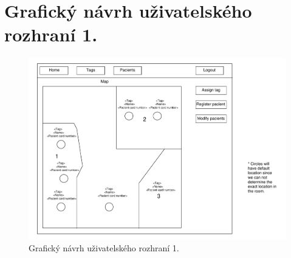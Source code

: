 \documentclass[czech,master,public,dept450,male,oneside, hidelinks]{diploma}
\begin{document}
	
	\MakeTitlePages
	
	\lstlistoflistings
	\cleardoublepage
	
	
	\setcounter{page}{14}	%
	\pagestyle{fancy}	
	
	
	
	\renewcommand{\refname}{Použitá literatura}
	\renewcommand{\bibname}{Použitá literatura}
		
	
	\appendix
	\label{appendix}
	\section{Grafický návrh uživatelského rozhraní 1.}
	\begin{figure}[H]
		\centering
		\includegraphics[width=16cm]{Appendix/src/Home.pdf}
		\caption{Grafický návrh uživatelského rozhraní 1.}
	\end{figure}
	
\end{document}
